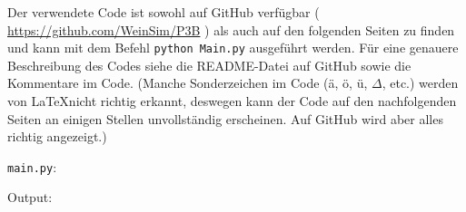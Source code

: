 \documentclass{article}
\newcommand{\githuburl}{
    \url{https://github.com/WeinSim/P3B}
}
\begin{document}
Der verwendete Code ist sowohl auf GitHub verfügbar (\githuburl) als auch auf den
folgenden Seiten zu finden und kann mit dem Befehl \texttt{python Main.py}
ausgeführt werden. Für eine genauere Beschreibung des Codes siehe die README-Datei
auf GitHub sowie die Kommentare im Code.
(Manche Sonderzeichen im Code (ä, ö, ü, $\Delta$, etc.) werden von \LaTeX nicht
richtig erkannt, deswegen kann der Code auf den nachfolgenden Seiten an einigen
Stellen unvollständig erscheinen. Auf GitHub wird aber alles richtig angezeigt.)

\newpage


\verb|main.py|:

\newpage

% 

Output:

\end{document}
